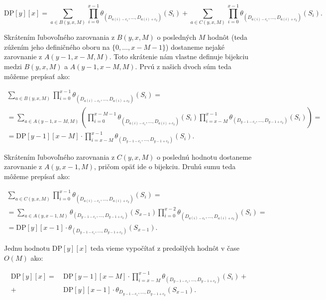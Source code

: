 $$\textrm{DP}[y][x] = \sum\limits_{a \in B(y, x, M)} \prod\limits_{i=0}^{x-1} \theta_{(D_{a(i)-c_1}, \dots, D_{a(i)+c_2})}(S_i)
+ \sum\limits_{a \in C(y, x, M)} \prod\limits_{i=0}^{x-1} \theta_{(D_{a(i)-c_1}, \dots, D_{a(i)+c_2})}(S_i) \text{.}$$

Skrátením ľubovoľného zarovnania z $B(y, x, M)$ o posledných $M$ hodnôt (teda zúžením jeho definičného oboru na $\{0, \dots, x-M-1\}$)
dostaneme nejaké zarovnanie z $A(y-1, x-M, M)$. Toto skrátenie nám vlastne definuje bijekciu medzi $B(y, x, M)$ a $A(y-1, x-M, M)$. Prvú z našich dvoch
súm teda môžeme prepísať ako:

\begin{multline*}
\sum\limits_{a \in B(y, x, M)} \prod\limits_{i=0}^{x-1} \theta_{(D_{a(i)-c_1}, \dots, D_{a(i)+c_2})}(S_i) = \\
= \sum\limits_{a \in A(y-1, x-M, M)}\left( \prod\limits_{i=0}^{x-M-1} \theta_{(D_{a(i)-c_1}, \dots, D_{a(i)+c_2})}(S_i)  \prod\limits_{i=x-M}^{x-1}\theta_{(D_{y-1-c_1}, \dots, D_{y-1+c_2})}(S_i)\right) = \\
= \mathrm{DP}[y-1][x-M] \cdot \prod\limits_{i=x-M}^{x-1}\theta_{(D_{y-1-c_1}, \dots, D_{y-1+c_2})}(S_i) \text{.}
\end{multline*}

Skrátením ľubovoľného zarovnania z $C(y, x, M)$ o poslednú hodnotu dostaneme zarovnanie z $A(y, x-1, M)$, pričom opäť ide o bijekciu. Druhú sumu teda
môžeme prepísať ako:

\begin{multline*}
\sum\limits_{a \in C(y, x, M)} \prod\limits_{i=0}^{x-1} \theta_{(D_{a(i)-c_1}, \dots, D_{a(i)+c_2})}(S_i) = \\
= \sum\limits_{a \in A(y, x-1, M)} \theta_{(D_{y-1-c_1}, \dots, D_{y-1+c_2})}(S_{x-1}) \prod\limits_{i=0}^{x-2} \theta_{(D_{a(i)-c_1}, \dots, D_{a(i)+c_2})}(S_i)  = \\
= \mathrm{DP}[y][x-1] \cdot \theta_{(D_{y-1-c_1}, \dots, D_{y-1+c_2})}(S_{x-1}) \text{.}
\end{multline*}

Jednu hodnotu $\mathrm{DP}[y][x]$ teda vieme vypočítať z predošlých hodnôt v čase $O(M)$ ako:

\begin{align*}
\mathrm{DP}[y][x] =~ &\mathrm{DP}[y-1][x-M] \cdot \prod\limits_{i=x-M}^{x-1} \theta_{(D_{y-1-c_1}, \dots, D_{y-1+c_2})} (S_i) + \\
+~ &\mathrm{DP}[y][x-1] \cdot \theta_{D_{y-1-c_1}, \dots, D_{y-1+c_2}}(S_{x-1}) \text{.}
\end{align*}


